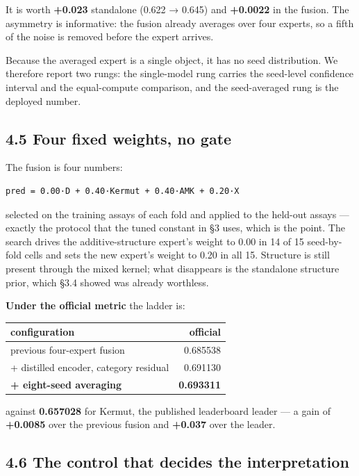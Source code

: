 It is worth \textbf{+0.023} standalone (0.622 → 0.645) and \textbf{+0.0022} in the fusion. The asymmetry is
informative: the fusion already averages over four experts, so a fifth of the noise is removed before
the expert arrives.

Because the averaged expert is a single object, it has no seed distribution. We therefore report two
rungs: the single-model rung carries the seed-level confidence interval and the equal-compute
comparison, and the seed-averaged rung is the deployed number.

\hypertarget{four-fixed-weights-no-gate}{%
\subsection{4.5 Four fixed weights, no gate}\label{four-fixed-weights-no-gate}}

The fusion is four numbers:

\begin{verbatim}
pred = 0.00·D + 0.40·Kermut + 0.40·AMK + 0.20·X
\end{verbatim}

selected on the training assays of each fold and applied to the held-out assays --- exactly the protocol
that the tuned constant in §3 uses, which is the point. The search drives the additive-structure
expert's weight to 0.00 in 14 of 15 seed-by-fold cells and sets the new expert's weight to 0.20 in all
15. Structure is still present through the mixed kernel; what disappears is the standalone structure
prior, which §3.4 showed was already worthless.

\textbf{Under the official metric} the ladder is:

\begin{longtable}[]{@{}lr@{}}
\toprule
configuration & official \\
\midrule
\endhead
previous four-expert fusion & 0.685538 \\
+ distilled encoder, category residual & 0.691130 \\
\textbf{+ eight-seed averaging} & \textbf{0.693311} \\
\bottomrule
\end{longtable}

against \textbf{0.657028} for Kermut, the published leaderboard leader --- a gain of \textbf{+0.0085} over the
previous fusion and \textbf{+0.037} over the leader.

\hypertarget{the-control-that-decides-the-interpretation}{%
\subsection{4.6 The control that decides the interpretation}\label{the-control-that-decides-the-interpretation}}

